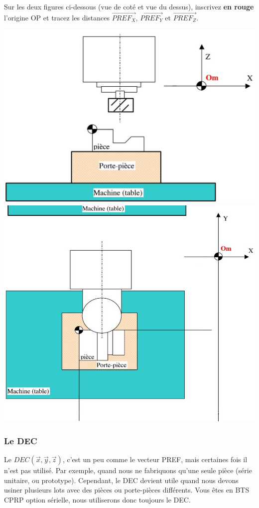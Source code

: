 \documentclass[12pt]{article}
\newcounter{exo}
\newenvironment{exo}{\stepcounter{exo}\vspace{0.5cm}{\bfseries Question \theexo\ :}}{\par\vspace{0.5cm}}
\begin{document}
\begin{exo}\label{exo1} Sur les deux figures ci-dessous (vue de coté et vue du dessus), inscrivez \textbf{en rouge} l'origine OP et tracez les distances $\overrightarrow{PREF_X}$, $\overrightarrow{PREF_Y}$ et $\overrightarrow{PREF_Z}$.\end{exo}
\begin{center}
\includegraphics[width=0.8\linewidth]{OmOP1.JPG}
\includegraphics[width=0.8\linewidth]{OmOP2.JPG}
\end{center}

\subsubsection{Le DEC}
\begin{tcolorbox}[colback=blue!5!white,colframe=red!75!black]
  \bcinfo Le $DEC(\vec{x}, \vec{y}, \vec{z})$, c'est un peu comme le vecteur PREF, mais certaines fois il n'est pas utilisé. Par exemple, quand nous ne fabriquons qu'une seule pièce (série unitaire, ou prototype). Cependant, le DEC devient utile quand nous devons usiner plusieurs lots avec des pièces ou porte-pièces différents. Vous êtes en BTS CPRP option sérielle, nous utiliserons donc toujours le DEC.
\end{tcolorbox}
\end{document}

